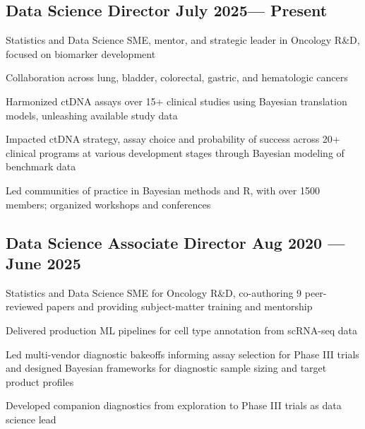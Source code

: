 \subsection{{Data Science Director \hfill July 2025--- Present}}
\begin{zitemize}
    \item Statistics and Data Science SME, mentor, and strategic leader in Oncology R\&D, focused on biomarker development
    \item Collaboration across lung, bladder, colorectal, gastric, and hematologic cancers
    \item Harmonized ctDNA assays over 15+ clinical studies using Bayesian translation models, unleashing available study data
    \item  Impacted ctDNA strategy, assay choice and probability of success across 20+ clinical programs at various development stages through Bayesian modeling of benchmark data
\item Led  communities of practice in Bayesian methods and R, with over 1500 members; organized workshops and conferences
\end{zitemize}

\subsection{{Data Science Associate Director \hfill Aug 2020 --- June 2025}}
\begin{zitemize}
    \item Statistics and Data Science SME for Oncology R\&D, co-authoring 9 peer-reviewed papers and providing subject-matter training and mentorship
    \item Delivered production ML pipelines for cell type annotation from scRNA-seq data
    \item Led multi-vendor diagnostic bakeoffs informing assay selection for Phase III trials and designed Bayesian frameworks for diagnostic sample sizing and target product profiles
    \item Developed companion diagnostics from exploration to Phase III trials as data science lead

\end{zitemize}

